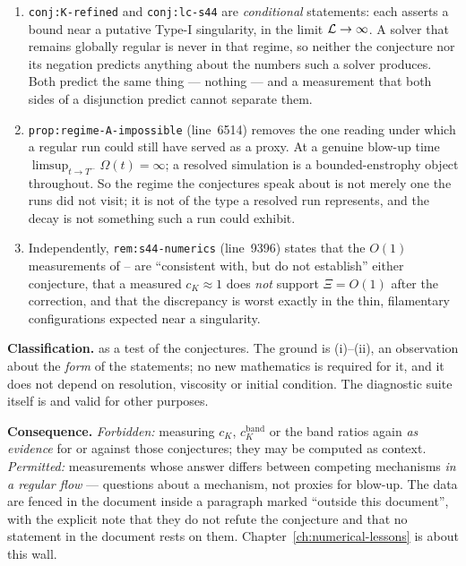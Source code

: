\begin{enumerate}[label=\textup{(\roman*)},leftmargin=2.4em]
\item \texttt{conj:K-refined} and \texttt{conj:lc-s44} are \emph{conditional}
  statements: each asserts a bound near a putative Type-I singularity, in the
  limit \(\mathcal{L}\to\infty\). A solver that remains globally regular is never in
  that regime, so neither the conjecture nor its negation predicts anything
  about the numbers such a solver produces. Both predict the same thing ---
  nothing --- and a measurement that both sides of a disjunction predict
  cannot separate them.
\item \texttt{prop:regime-A-\allowbreak{}impossible} (line~6514) removes the one reading
  under which a regular run could still have served as a proxy. At a genuine
  blow-up time \(\limsup_{t\to T^-}\Omega(t)=\infty\); a resolved simulation is
  a bounded-enstrophy object throughout. So the regime the conjectures speak
  about is not merely one the runs did not visit; it is not of the type a
  resolved run represents, and the decay is not something such a run could
  exhibit.
\item Independently, \texttt{rem:s44-numerics} (line~9396) states that the
  \(O(1)\) measurements of -- are ``consistent with, but do not
  establish'' either conjecture, that a measured \(c_K\approx1\) does
  \emph{not} support \(\Xi=O(1)\) after the  correction, and that the
  discrepancy is worst exactly in the thin, filamentary configurations expected
  near a singularity.
\end{enumerate}

\textbf{Classification.} \IMPOSSIBLE{} as a test of the conjectures. The ground
is (i)--(ii), an observation about the \emph{form} of the statements; no new
mathematics is required for it, and it does not depend on resolution, viscosity
or initial condition. The diagnostic suite itself is \OPEN{} and valid for
other purposes.

\textbf{Consequence.} \emph{Forbidden:} measuring \(c_K\),
\(c_K^{\mathrm{band}}\) or the band ratios again \emph{as evidence} for or
against those conjectures; they may be computed as context. \emph{Permitted:}
measurements whose answer differs between competing mechanisms \emph{in a
regular flow} --- questions about a mechanism, not proxies for blow-up. The
 data are fenced in the document inside a paragraph marked ``outside
this document'', with the explicit note that they do not refute the conjecture
and that no statement in the document rests on them.
Chapter~\ref{ch:numerical-lessons} is about this wall.

